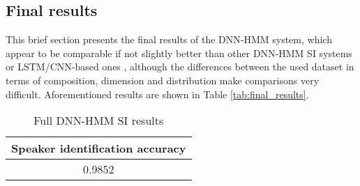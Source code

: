\subsection{Final results}
This brief section presents the final results of the DNN-HMM system, which appear to be comparable if not slightly better than other DNN-HMM SI systems \cite{si:dnnhmm} or LSTM/CNN-based ones \cite{si:lstm}, although the differences between the used dataset in terms of composition, dimension and distribution make comparisons very difficult. Aforementioned results are shown in Table \vref{tab:final_results}.

\begin{footnotesize}
	\begin{table}
		\centering
		\caption{Full DNN-HMM SI results}
		\begin{tabularx}{0.5\textwidth}{c}
			\toprule
			\textbf{Speaker identification accuracy}   \\
			\midrule
			0.9852	                 		\\[0.25cm]
			\bottomrule
		\end{tabularx}
	\end{table}\label{tab:final_results}
\end{footnotesize}